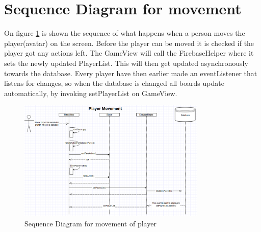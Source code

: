 \section{Sequence Diagram for movement}

On figure \ref{SquenceDiagramMovement} is shown the sequence of what happens when a person moves the player(avatar) on the screen. Before the player can be moved it is checked if the player got any actions left. The GameView will call the FirebaseHelper where it sets the newly updated PlayerList. This will then get updated asynchronously towards the database. 
Every player have then earlier made an eventListener that listens for changes, so when the database is changed all boards update automatically, by invoking setPlayerList on GameView.

\begin{figure}
	\centering
	\includegraphics[width=0.8\textwidth]{images/SquenceDiagramMovement.PNG}
	\caption{Sequence Diagram for movement of player \label{SquenceDiagramMovement}}
\end{figure}